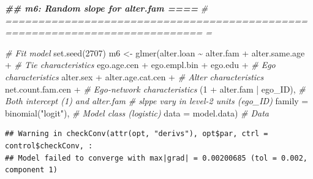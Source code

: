\documentclass[
]{book}
\newenvironment{Shaded}{\begin{snugshade}}{\end{snugshade}}
\newcommand{\AttributeTok}[1]{\textcolor[rgb]{0.77,0.63,0.00}{#1}}
\newcommand{\CommentTok}[1]{\textcolor[rgb]{0.56,0.35,0.01}{\textit{#1}}}
\newcommand{\DecValTok}[1]{\textcolor[rgb]{0.00,0.00,0.81}{#1}}
\newcommand{\DocumentationTok}[1]{\textcolor[rgb]{0.56,0.35,0.01}{\textbf{\textit{#1}}}}
\newcommand{\FunctionTok}[1]{\textcolor[rgb]{0.00,0.00,0.00}{#1}}
\newcommand{\NormalTok}[1]{#1}
\newcommand{\OtherTok}[1]{\textcolor[rgb]{0.56,0.35,0.01}{#1}}
\newcommand{\SpecialCharTok}[1]{\textcolor[rgb]{0.00,0.00,0.00}{#1}}
\newcommand{\StringTok}[1]{\textcolor[rgb]{0.31,0.60,0.02}{#1}}
\begin{document}
\begin{Shaded}
\begin{Highlighting}[]
\DocumentationTok{\#\# m6: Random slope for alter.fam                                           ====}
\CommentTok{\# ============================================================================ =}

\CommentTok{\# Fit model}
\FunctionTok{set.seed}\NormalTok{(}\DecValTok{2707}\NormalTok{)}
\NormalTok{m6 }\OtherTok{\textless{}{-}} \FunctionTok{glmer}\NormalTok{(alter.loan }\SpecialCharTok{\textasciitilde{}}\NormalTok{ alter.fam }\SpecialCharTok{+}\NormalTok{ alter.same.age }\SpecialCharTok{+} \CommentTok{\# Tie characteristics}
\NormalTok{              ego.age.cen }\SpecialCharTok{+}\NormalTok{ ego.empl.bin }\SpecialCharTok{+}\NormalTok{ ego.edu }\SpecialCharTok{+} \CommentTok{\# Ego characteristics}
\NormalTok{              alter.sex }\SpecialCharTok{+}\NormalTok{ alter.age.cat.cen }\SpecialCharTok{+}  \CommentTok{\# Alter characteristics}
\NormalTok{              net.count.fam.cen }\SpecialCharTok{+} \CommentTok{\# Ego{-}network characteristics}
\NormalTok{              (}\DecValTok{1} \SpecialCharTok{+}\NormalTok{ alter.fam }\SpecialCharTok{|}\NormalTok{ ego\_ID), }\CommentTok{\# Both intercept (1) and alter.fam }
            \CommentTok{\# slppe vary in level{-}2 units (ego\_ID)}
            \AttributeTok{family =} \FunctionTok{binomial}\NormalTok{(}\StringTok{"logit"}\NormalTok{), }\CommentTok{\# Model class (logistic)}
            \AttributeTok{data =}\NormalTok{ model.data) }\CommentTok{\# Data}
\end{Highlighting}
\end{Shaded}

\begin{verbatim}
## Warning in checkConv(attr(opt, "derivs"), opt$par, ctrl = control$checkConv, :
## Model failed to converge with max|grad| = 0.00200685 (tol = 0.002, component 1)
\end{verbatim}
\end{document}
